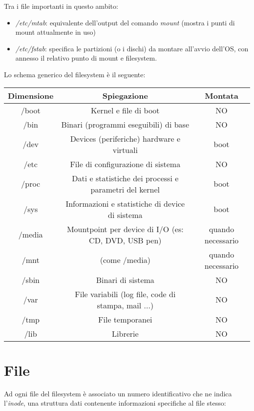 Tra i file importanti in questo ambito:
\begin{itemize}
    \item \textit{/etc/mtab}: equivalente dell'output del comando \textit{mount} (mostra i punti di mount attualmente in uso)
    \item \textit{/etc/fstab}: specifica le partizioni (o i dischi) da montare all'avvio dell'OS, con annesso il relativo punto di mount e filesystem.
\end{itemize}

Lo schema generico del filesystem è il seguente:

\begin{center}
	\begin{tabular}{| c | c | c |}
		\hline
		\textbf{Dimensione}& \textbf{Spiegazione} & \textbf{Montata} \\ \hline
		/boot & Kernel e file di boot & NO \\
		\hline
		/bin & Binari (programmi eseguibili) di base & NO \\ 
		\hline
		/dev & Devices (periferiche) hardware e virtuali & boot \\ 
		\hline
		/etc & File di configurazione di sistema & NO \\
		\hline
		/proc & Dati e statistiche dei processi e parametri del kernel & boot \\
		\hline
		/sys & Informazioni e statistiche di device di sistema & boot \\
		\hline
		/media & Mountpoint per device di I/O (es:  CD, DVD, USB pen) & quando necessario \\
		\hline
		/mnt & (come /media) & quando necessario \\
		\hline
		/sbin & Binari di sistema & NO \\
		\hline
		/var & File variabili (log file, code di stampa, mail ...) & NO \\
		\hline
		/tmp & File temporanei & NO \\
		\hline
		/lib & Librerie & NO \\
		\hline
	\end{tabular}
\end{center}

\section{File}
Ad ogni file del filesystem è associato un numero identificativo che ne indica l'\textit{inode}, una struttura dati contenente informazioni specifiche al file stesso:

